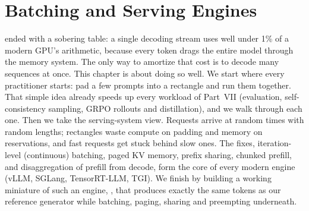\chapter{Batching and Serving Engines}\label{ch:serving}

 ended with a sobering table: a single decoding stream uses well under 1\% of a
modern GPU's arithmetic, because every token drags the entire model through the memory system.
The only way to amortize that cost is to decode many sequences at once. This chapter is about
doing so well. We start where every practitioner starts: pad a few prompts into a rectangle and
run them together. That simple idea already speeds up every workload of Part~VII (evaluation,
self-consistency sampling, GRPO rollouts and distillation), and we walk through each one. Then we
take the serving-system view. Requests arrive at random times with random lengths; rectangles waste
compute on padding and memory on reservations, and fast requests get stuck behind slow ones. The
fixes, iteration-level (continuous) batching, paged KV memory, prefix sharing, chunked prefill, and
disaggregation of prefill from decode, form the core of every modern engine (vLLM, SGLang,
TensorRT-LLM, TGI). We finish by building a working miniature of such an engine,
, that produces exactly the same tokens as our reference generator while
batching, paging, sharing and preempting underneath.


